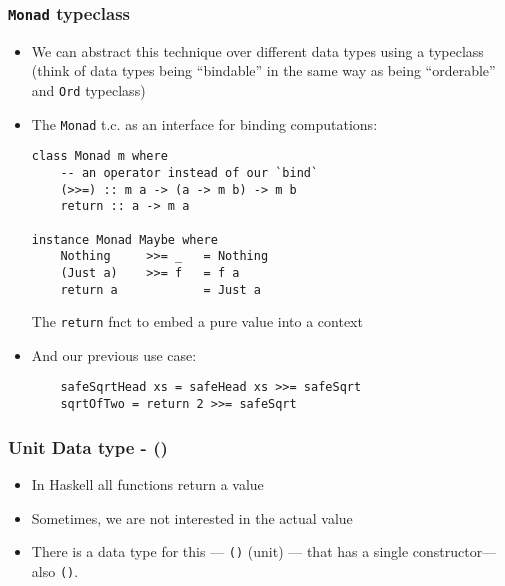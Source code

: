 \documentclass[final,handout]{beamer}
\begin{document}
\begin{frame}[fragile]
    \frametitle{\texttt{Monad} typeclass}
    
    \begin{itemize}
        \item We can abstract this technique over different data types using
            a typeclass (think of data types being ``bindable'' in the same way
            as being ``orderable'' and \texttt{Ord} typeclass)
        \item<2-> The \texttt{Monad} t.c. as an interface for binding computations:
{\small
    \begin{verbatim}
class Monad m where
    -- an operator instead of our `bind`
    (>>=) :: m a -> (a -> m b) -> m b
    return :: a -> m a

instance Monad Maybe where
    Nothing     >>= _   = Nothing
    (Just a)    >>= f   = f a
    return a            = Just a
    \end{verbatim}
}
        The \texttt{return} fnct to embed a pure value
        into a context

        \item<3-> And our previous use case:
{\small
\begin{verbatim}
    safeSqrtHead xs = safeHead xs >>= safeSqrt 
    sqrtOfTwo = return 2 >>= safeSqrt
\end{verbatim}
}
    \end{itemize}

\end{frame}

\begin{frame}[fragile]
    \frametitle{Unit Data type - ()}

    \begin{itemize}
        \item In Haskell all functions return a value
        \item Sometimes, we are not interested in the actual  value
        \item There is a data type for this --- \texttt{()} (unit) --- that has
            a single constructor---also \texttt{()}.
    \end{itemize}
\end{frame}
\end{document}
